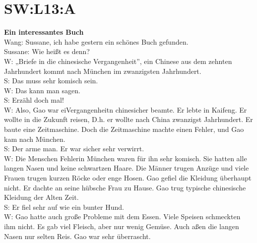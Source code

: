 \section{SW:L13:A}
\textbf{Ein interessantes Buch} \\
Wang: Sussane, ich habe gestern ein schönes Buch gefunden. \\
Sussane: Wie heißt es denn? \\
W: „Briefe in die chinesische Vergangenheit”, 
ein Chinese aus dem zehnten Jahrhundert kommt nach München im zwanzigsten Jahrhundert. \\
S: Das muss sehr komisch sein. \\
W: Das kann man sagen. \\
S: Erzähl doch mal! \\
W: Also, Gao war eiVergangenheitn chinesicher beamte. Er lebte in Kaifeng.
Er wollte in die Zukunft reisen, 
D.h. er wollte nach China zwanzigst Jahrhundert. Er baute eine Zeitmaschine.
Doch die Zeitmaschine machte einen Fehler,  und Gao kam nach München. \\
S: Der arme man. Er war sicher sehr verwirrt.  \\
W: Die Menschen Fehlerin München waren für ihn sehr komisch. Sie hatten alle langen Nasen und keine schwartzen Haare.
Die Männer trugen Anzüge und viele Frauen trugen kurzen Röcke oder enge Hosen.
Gao gefiel die Kleidung überhaupt nicht.  Er dachte an seine hübsche Frau zu Hause.
Gao trug typische chinesische Kleidung der Alten Zeit. \\
S: Er fiel sehr auf wie ein bunter Hund.  \\
W: Gao hatte auch große Probleme mit dem Essen.
Viele Speisen schmeckten ihm nicht. Es gab viel Fleisch, aber nur wenig Gemüse.
Auch aßen die langen Nasen nur selten Reis.  Gao war sehr überrascht. 
